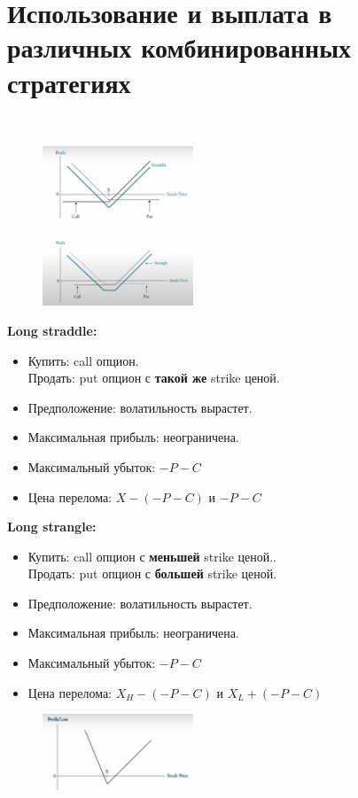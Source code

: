 \documentclass{article}
\begin{document}
 \section{Использование и выплата в различных комбинированных стратегиях}\\
 
 \begin{figure}
    \centering    \includegraphics[width=0.4\textwidth]{straddle n strangle.png}
\end{figure}

 \textbf{Long straddle:}
 \begin{itemize}
 \item Купить: call опцион.\\
Продать: put опцион с \textbf{такой же} strike ценой.
\item Предположение: волатильность вырастет.
\item Максимальная прибыль: неограничена.
\item Максимальный убыток: $ -P - C $
\item Цена перелома: $ X - (-P - C) $ и $ -P - C $
\end{itemize}

\textbf{Long strangle:}
 \begin{itemize}
 \item Купить: call опцион с \textbf{меньшей} strike ценой..\\
Продать: put опцион с \textbf{большей} strike ценой.
\item Предположение: волатильность вырастет.
\item Максимальная прибыль: неограничена.
\item Максимальный убыток: $ -P - C $
\item Цена перелома: $ X_H - (-P - C) $ и $ X_L + ( -P - C) $
\end{itemize}


\begin{figure}
    \centering    \includegraphics[width=0.4\textwidth]{strip strap.png}
\end{figure}
\end{document}
